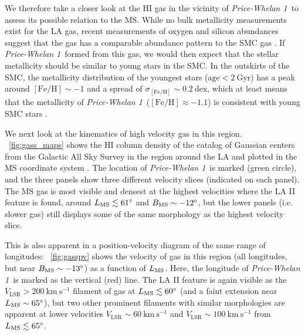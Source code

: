 \documentclass[twocolumn]{aastex62}
\newcommand{\kms}{\ensuremath{\textrm{km}~\textrm{s}^{-1}}}
\newcommand{\feh}{\ensuremath{[\textrm{Fe} / \textrm{H}]}}
\newcommand{\hi}{H{\footnotesize I} }
\newcommand{\clustername}{\textsl{Price-Whelan 1}}
\begin{document}
We therefore take a closer look at the \hi gas in the vicinity of \clustername\ to assess its possible relation to the MS.
While no bulk metallicity measurements exist for the LA gas, recent measurements of oxygen and silicon abundances suggest that the gas has a comparable abundance pattern to the SMC gas \citep{Fox:2018, Richter:2018}.
If \clustername\ formed from this gas, we would then expect that the stellar metallicity should be similar to young stars in the SMC.
In the outskirts of the SMC, the metallicity distribution of the youngest stars ($\textrm{age} < 2~\textrm{Gyr}$) has a peak around $\feh \sim -1$ and a spread of $\sigma_{\feh} \sim 0.2~\textrm{dex}$, which at least means that the metallicity of \clustername\ ($\feh \approx -1.1$) is consistent with young SMC stars \citep{Dobbie:2014}.

We next look at the kinematics of high velocity gas in this region.
\figurename~\ref{fig:gass_maps} shows the \hi column density of the catalog of Gaussian centers \citep[producted with the techniques and software from][]{Nidever:2008} from the Galactic All Sky Survey \citep[GASS;][]{McClure-Griffiths:2009, Kalberla:2010} in the region around the LA and plotted in the MS coordinate system \citep[$L_{\rm MS}, B_{\rm MS}$;][]{Nidever:2008}.
The location of \clustername\ is marked (green circle), and the three panels show three different velocity slices (indicated on each panel).
The MS gas is most visible and densest at the highest velocities where the LA II feature is found, around $L_{\rm MS} \lesssim 61^\circ$ and $B_{\rm MS} \sim -12^\circ$, but the lower panels (i.e. slower gas) still displays some of the same morphology as the highest velocity slice. 

This is also apparent in a position-velocity diagram of the same range of longitudes:
\figurename~\ref{fig:gasspv} shows the velocity of gas in this region (all longitudes, but near $B_{\rm MS} \sim -13^\circ$) as a function of $L_{\rm MS}$.
Here, the longitude of \clustername\ is marked as the vertical (red) line.
The LA II feature is again visible as the $V_{\textrm{LSR}} > 200~\kms$ filament of gas at $L_{\rm MS} \lesssim 60^\circ$ (and a faint extension near $L_{\rm MS} \sim 65^\circ$), but two other prominent filaments with similar morphologies are apparent at lower velocities $V_{\textrm{LSR}} \sim 60~\kms$ and $V_{\textrm{LSR}} \sim 100~\kms$ from $L_{\rm MS} \lesssim 65^\circ$.
\end{document}
